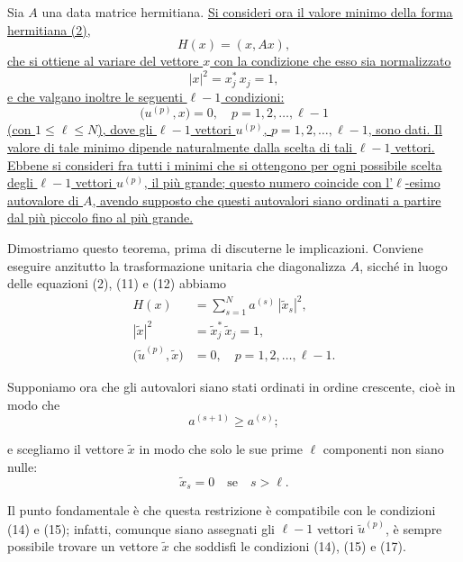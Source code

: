 \documentclass[11pt, a4paper]{book}
\numberwithin{equation}{section}
\begin{document}
Sia $A$ una data matrice hermitiana. \uline{Si consideri ora il valore
minimo della forma hermitiana (2),}
\[
H(x) = (x, Ax),
\]
\uline{che si ottiene al variare del vettore $x$ con la condizione che esso
sia normalizzato}
\begin{equation}
|x|^2 = x_j^*\,x_j = 1,
\end{equation}
\uline{e che valgano inoltre le seguenti $\ell-1$ condizioni:}
\begin{equation}
\bigl(u^{(p)}, x\bigr) = 0, \quad p = 1, 2, \ldots, \ell-1
\end{equation}
\uline{(con $1 \leq \ell \leq N$), dove gli $\ell-1$ vettori $u^{(p)}$,
$p=1,2,\ldots,\ell-1$, sono dati. Il valore di tale minimo dipende
naturalmente dalla scelta di tali $\ell-1$ vettori. Ebbene si consideri fra
tutti i minimi che si ottengono per ogni possibile scelta degli $\ell-1$
vettori $u^{(p)}$, il più grande; questo numero coincide con l'$\ell$-esimo
autovalore di $A$, avendo supposto che questi autovalori siano ordinati a
partire dal più piccolo fino al più grande.}

Dimostriamo questo teorema, prima di discuterne le implicazioni. Conviene
eseguire anzitutto la trasformazione unitaria che diagonalizza $A$, sicché
in luogo delle equazioni (2), (11) e (12) abbiamo
\begin{align}
H(x) &= \sum_{s=1}^{N} a^{(s)}\,|\widetilde{x}_s|^2, \tag{13} \\
|\widetilde{x}|^2 &= \widetilde{x}_j^*\,\widetilde{x}_j = 1, \tag{14} \\
\bigl(\widetilde{u}^{(p)}, \widetilde{x}\bigr) &= 0,
  \quad p = 1, 2, \ldots, \ell-1. \tag{15}
\end{align}

Supponiamo ora che gli autovalori siano stati ordinati in ordine crescente,
cioè in modo che
\begin{equation}
a^{(s+1)} \geq a^{(s)};
\end{equation}


e scegliamo il vettore $\widetilde{x}$ in modo che solo le sue prime $\ell$
componenti non siano nulle:
\begin{equation}
\widetilde{x}_s = 0 \quad \text{se} \quad s > \ell.
\end{equation}

Il punto fondamentale è che questa restrizione è compatibile con le
condizioni (14) e (15); infatti, comunque siano assegnati gli $\ell-1$
vettori $\widetilde{u}^{(p)}$, è sempre possibile trovare un vettore
$\widetilde{x}$ che soddisfi le condizioni (14), (15) e (17).
\end{document}
